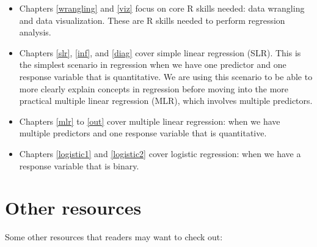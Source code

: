 \documentclass[
]{book}
\begin{document}
\begin{itemize}
\item
  Chapters \ref{wrangling} and \ref{viz} focus on core R skills needed: data wrangling and data visualization. These are R skills needed to perform regression analysis.
\item
  Chapters \ref{slr}, \ref{inf}, and \ref{diag} cover simple linear regression (SLR). This is the simplest scenario in regression when we have one predictor and one response variable that is quantitative. We are using this scenario to be able to more clearly explain concepts in regression before moving into the more practical multiple linear regression (MLR), which involves multiple predictors.
\item
  Chapters \ref{mlr} to \ref{out} cover multiple linear regression: when we have multiple predictors and one response variable that is quantitative.
\item
  Chapters \ref{logistic1} and \ref{logistic2} cover logistic regression: when we have a response variable that is binary.
\end{itemize}

\hypertarget{other-resources}{%
\section*{Other resources}\label{other-resources}}

Some other resources that readers may want to check out:
\end{document}
